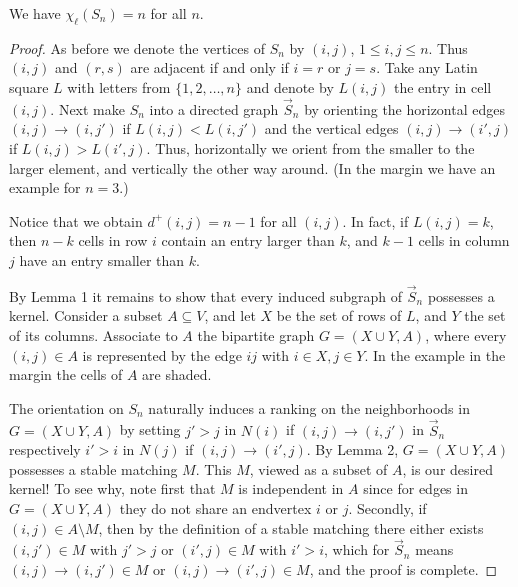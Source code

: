 \begin{theorem}
  \label{ch38theorem}
  We have $\chi_\ell(S_n) = n$ for all $n$.
\end{theorem}
\begin{proof}
As before we denote the vertices of $S_n$ by $(i, j)$, $1 \leq i, j \leq n$. Thus $(i, j)$ and
$(r, s)$ are adjacent if and only if $i = r$ or $j = s$. Take any Latin square $L$ with letters
from $\{1, 2, \dots, n\}$ and denote by $L(i, j)$ the entry in cell $(i, j)$. Next make $S_n$ into
a directed graph $\vec{S}_n$ by orienting the horizontal edges $(i, j) \rightarrow (i, j')$ if
$L(i, j) < L(i, j')$ and the vertical edges $(i, j) \rightarrow (i', j)$ if $L(i, j) > L(i', j)$.
Thus, horizontally we orient from the smaller to the larger element, and vertically the other
way around. (In the margin we have an example for $n = 3$.)

Notice that we obtain $d^+(i, j) = n - 1$ for all $(i, j)$. In fact, if $L(i, j) = k$, then $n - k$
cells in row $i$ contain an entry larger than $k$, and $k - 1$ cells in column $j$ have an entry
 smaller than $k$.

By Lemma 1 it remains to show that every induced subgraph of $\vec{S}_n$ possesses a kernel.
Consider a subset $A \subseteq V$, and let $X$ be the set of rows of $L$, and $Y$ the set of
its columns. Associate to $A$ the bipartite graph $G = (X \cup Y, A)$, where every $(i, j) \in A$ is
represented by the edge $ij$ with $i \in X, j \in Y$. In the example in the margin the cells of $A$
are shaded.

The orientation on $S_n$ naturally induces a ranking on the neighborhoods in $G = (X \cup Y, A)$
by setting $j' > j$ in $N(i)$ if $(i, j) \rightarrow (i, j')$ in $\vec{S}_n$
respectively $i' > i$ in $N(j)$ if $(i, j) \rightarrow (i', j)$. By Lemma 2, $G = (X \cup Y, A)$
possesses a stable matching $M$. This $M$, viewed as a subset of $A$, is our desired kernel!
To see why, note first that $M$ is independent in $A$ since for edges in $G = (X \cup Y, A)$
they do not share an endvertex $i$ or $j$. Secondly, if $(i, j) \in A \setminus M$, then by the
definition of a stable matching there either exists $(i, j') \in M$ with $j' > j$ or
$(i', j) \in M$ with $i' > i$, which for $\vec{S}_n$ means $(i, j) \rightarrow (i, j') \in M$
 or $(i, j) \rightarrow (i', j) \in M$, and the proof is complete.
\end{proof}
